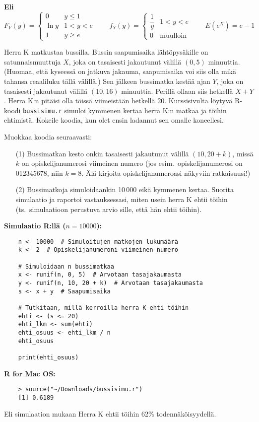 \documentclass[12pt,a4paper]{article}
\begin{document}
\textbf{Eli}\\
\[
F_Y(y)=
\begin{cases}
0& y\le 1\\
\ln y& 1<y<e\\
1& y\ge e
\end{cases}
\qquad
f_Y(y)=
\begin{cases}
\dfrac{1}{y}& 1<y<e\\
0& \text{muulloin}
\end{cases}
\qquad
E(e^X)=e-1
\]






\pagebreak

Herra K matkustaa bussilla. Bussin saapumisaika lähtöpysäkille
on satunnaismuuttuja $X$, joka on tasaisesti jakautunut välillä $(0,5)$
minuuttia. (Huomaa, että kyseessä on jatkuva jakauma, saapumisaika voi siis 
olla mikä tahansa reaaliluku tällä välillä.) Sen jälkeen bussimatka kestää
ajan $Y$, joka on tasaisesti jakautunut välillä $(10,16)$ minuuttia. Perillä
ollaan siis hetkellä $X+Y$. Herra K:n pitäisi olla töissä viimeistään hetkellä
20. Kurssisivulta löytyvä R-koodi \texttt{bussisimu.r} simuloi kymmenen kertaa 
herra K:n matkaa ja töihin ehtimistä. Kokeile koodia, kun olet ensin ladannut 
sen omalle koneellesi.

Muokkaa koodia seuraavasti:
\begin{enumerate}
\item[(1)] Bussimatkan kesto onkin tasaisesti jakautunut välillä $(10,20+k)$,
missä $k$ on opiskelijanumerosi viimeinen numero (jos esim.\ opiskelijanumerosi
on 012345678, niin $k=8$. Älä kirjoita opiskelijanumeroasi näkyviin ratkaisuusi!)
\item[(2)] Bussimatkoja simuloidaankin 10\,000 eikä kymmenen kertaa. Suorita 
simulaatio ja raportoi vastauksessasi, miten usein herra K ehtii töihin
(ts.\ simulaatioon perustuva arvio sille, että hän ehtii töihin).
\end{enumerate}




\textbf{Simulaatio R:llä (\(n=10000\)):}
{\small
\begin{verbatim}
    n <- 10000  # Simuloitujen matkojen lukumäärä
    k <- 2  # Opiskelijanumeroni viimeinen numero

    # Simuloidaan n bussimatkaa
    x <- runif(n, 0, 5)  # Arvotaan tasajakaumasta
    y <- runif(n, 10, 20 + k)  # Arvotaan tasajakaumasta
    s <- x + y  # Saapumisaika

    # Tutkitaan, millä kerroilla herra K ehti töihin
    ehti <- (s <= 20)
    ehti_lkm <- sum(ehti)
    ehti_osuus <- ehti_lkm / n
    ehti_osuus

    print(ehti_osuus)
\end{verbatim}
}

\textbf{R for Mac OS:}
\begin{verbatim}
    > source("~/Downloads/bussisimu.r")
    [1] 0.6189
\end{verbatim}
Eli simulaation mukaan Herra K ehtii töihin 62\% todennäköisyydellä.
\end{document}
